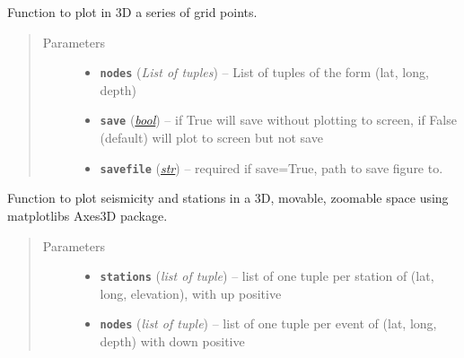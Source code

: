 \documentclass[a4paper,10pt,english]{sphinxmanual}
\begin{document}
\begin{fulllineitems}
\label{utils:EQcorrscan_plotting.threeD_gridplot}
Function to plot in 3D a series of grid points.
\begin{quote}\begin{description}
\item[{Parameters}] \leavevmode\begin{itemize}
\item {} 
\textbf{\texttt{nodes}} (\emph{List of tuples}) -- List of tuples of the form (lat, long, depth)

\item {} 
\textbf{\texttt{save}} (\href{https://docs.python.org/library/functions.html\#bool}{\emph{bool}}) -- if True will save without plotting to screen, if False        (default) will plot to screen but not save

\item {} 
\textbf{\texttt{savefile}} (\href{https://docs.python.org/library/functions.html\#str}{\emph{str}}) -- required if save=True, path to save figure to.

\end{itemize}

\end{description}\end{quote}

\end{fulllineitems}


\begin{fulllineitems}
\label{utils:EQcorrscan_plotting.threeD_seismplot}
Function to plot seismicity and stations in a 3D, movable, zoomable space
using matplotlibs Axes3D package.
\begin{quote}\begin{description}
\item[{Parameters}] \leavevmode\begin{itemize}
\item {} 
\textbf{\texttt{stations}} (\emph{list of tuple}) -- list of one tuple per station of (lat, long, elevation),
with up positive

\item {} 
\textbf{\texttt{nodes}} (\emph{list of tuple}) -- list of one tuple per event of (lat, long, depth) with down
positive

\end{itemize}

\end{description}\end{quote}

\end{fulllineitems}
\end{document}
